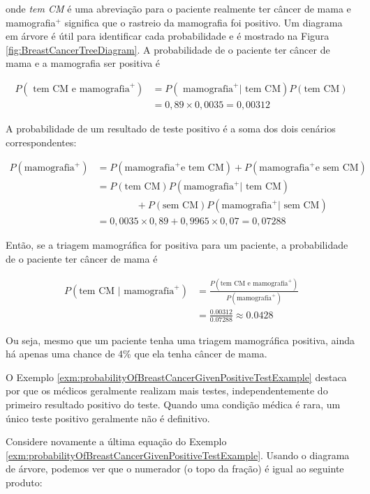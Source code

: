 \documentclass[
]{book}
\theoremstyle{definition}
\theoremstyle{definition}
\theoremstyle{definition}
\theoremstyle{definition}
\theoremstyle{remark}
\begin{document}
onde \emph{tem CM} é uma abreviação para o paciente realmente ter câncer de mama e mamografia\(^+\) significa que o rastreio da mamografia foi positivo. Um diagrama em árvore é útil para identificar cada probabilidade e é mostrado na Figura \ref{fig:BreastCancerTreeDiagram}. A probabilidade de o paciente ter câncer de mama e a mamografia ser positiva é

\begin{align*}
P(\text{ tem CM e mamografia}^+) &= P(\text{ mamografia}^+ | \text{ tem CM})P(\text{tem CM}) \\
    &= 0,89\times 0,0035 = 0,00312
\end{align*}

A probabilidade de um resultado de teste positivo é a soma dos dois cenários correspondentes:

\begin{align*}
P(\text{mamografia}^+) &= P(\text{mamografia}^+ \text{e tem CM}) + P(\text{mamografia}^+ \text{e sem CM}) \\
    &= P(\text{tem CM})P(\text{mamografia}^+ | \text{ tem CM}) \\
    &\qquad\qquad   + P(\text{sem CM})P(\text{mamografia}^+ | \text{ sem CM}) \\
    &= 0,0035\times 0,89 + 0,9965\times 0,07 = 0,07288
\end{align*}

Então, se a triagem mamográfica for positiva para um paciente, a probabilidade de o paciente ter câncer de mama é

\begin{align*}
P(\text{tem CM } | \text{ mamografia}^+)
    &= \frac{P(\text{tem CM e mamografia} ^+)}{P(\text{mamografia}^+)}\\
    &= \frac{0.00312}{0.07288} \approx 0.0428
\end{align*}

Ou seja, mesmo que um paciente tenha uma triagem mamográfica positiva, ainda há apenas uma chance de 4\% que ela tenha câncer de mama.

O Exemplo \ref{exm:probabilityOfBreastCancerGivenPositiveTestExample} destaca por que os médicos geralmente realizam mais testes, independentemente do primeiro resultado positivo do teste. Quando uma condição médica é rara, um único teste positivo geralmente não é definitivo.

Considere novamente a última equação do Exemplo \ref{exm:probabilityOfBreastCancerGivenPositiveTestExample}.
Usando o diagrama de árvore, podemos ver que o numerador (o topo da fração) é igual ao seguinte produto:
\end{document}
